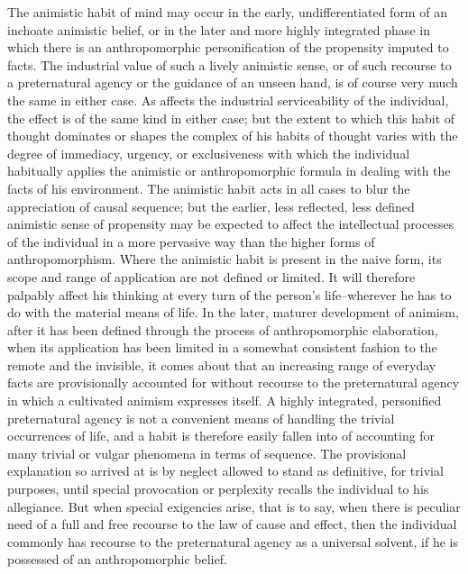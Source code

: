\documentclass[12pt]{report}
\begin{document}
The animistic habit of mind may occur in the early, undifferentiated
form of an inchoate animistic belief, or in the later and more highly
integrated phase in which there is an anthropomorphic personification of
the propensity imputed to facts. The industrial value of such a lively
animistic sense, or of such recourse to a preternatural agency or the
guidance of an unseen hand, is of course very much the same in either
case. As affects the industrial serviceability of the individual, the
effect is of the same kind in either case; but the extent to which
this habit of thought dominates or shapes the complex of his habits of
thought varies with the degree of immediacy, urgency, or exclusiveness
with which the individual habitually applies the animistic or
anthropomorphic formula in dealing with the facts of his environment.
The animistic habit acts in all cases to blur the appreciation of causal
sequence; but the earlier, less reflected, less defined animistic sense
of propensity may be expected to affect the intellectual processes
of the individual in a more pervasive way than the higher forms of
anthropomorphism. Where the animistic habit is present in the naive
form, its scope and range of application are not defined or limited.
It will therefore palpably affect his thinking at every turn of the
person's life--wherever he has to do with the material means of life.
In the later, maturer development of animism, after it has been defined
through the process of anthropomorphic elaboration, when its application
has been limited in a somewhat consistent fashion to the remote and the
invisible, it comes about that an increasing range of everyday facts are
provisionally accounted for without recourse to the preternatural agency
in which a cultivated animism expresses itself. A highly integrated,
personified preternatural agency is not a convenient means of handling
the trivial occurrences of life, and a habit is therefore easily fallen
into of accounting for many trivial or vulgar phenomena in terms of
sequence. The provisional explanation so arrived at is by neglect
allowed to stand as definitive, for trivial purposes, until special
provocation or perplexity recalls the individual to his allegiance. But
when special exigencies arise, that is to say, when there is peculiar
need of a full and free recourse to the law of cause and effect, then
the individual commonly has recourse to the preternatural agency as a
universal solvent, if he is possessed of an anthropomorphic belief.
\end{document}
